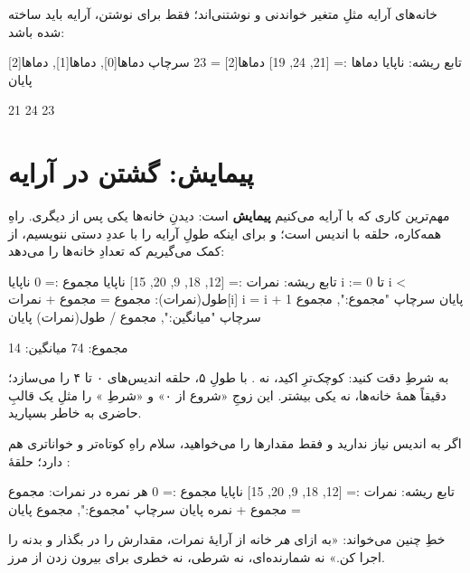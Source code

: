 خانه‌های آرایه مثلِ متغیر خواندنی و نوشتنی‌اند؛ فقط برای نوشتن، آرایه
باید  ساخته شده باشد:

\begin{salamfa}
تابع ریشه:
    ناپایا دماها := [21, 24, 19]
    دماها[2] = 23
    سرچاپ دماها[0], دماها[1], دماها[2]
پایان
\end{salamfa}

\begin{progout}
21 24 23
\end{progout}

\section{پیمایش: گشتن در آرایه}

مهم‌ترین کاری که با آرایه می‌کنیم \textbf{پیمایش} است: دیدنِ خانه‌ها یکی
پس از دیگری. راهِ همه‌کاره، حلقه با اندیس است؛ و برای اینکه طولِ آرایه را
با عددِ دستی ننویسیم، از  کمک می‌گیریم که تعدادِ خانه‌ها را
می‌دهد:

\begin{salamfa}
تابع ریشه:
    نمرات := [12, 18, 9, 20, 15]
    ناپایا مجموع := 0
    ناپایا i := 0
    تا i < طول(نمرات):
        مجموع = مجموع + نمرات[i]
        i = i + 1
    پایان
    سرچاپ "مجموع:", مجموع
    سرچاپ "میانگین:", مجموع / طول(نمرات)
پایان
\end{salamfa}

\begin{progoutfa}
مجموع: 74
میانگین: 14
\end{progoutfa}

به شرطِ  دقت کنید: کوچک‌ترِ اکید، نه \code{<=}. با
طولِ ۵، حلقه اندیس‌های ۰ تا ۴ را می‌سازد؛ دقیقاً همهٔ خانه‌ها، نه یکی
بیشتر. این زوجِ «شروع از ۰» و «شرطِ » را مثلِ یک قالبِ حاضری
به خاطر بسپارید.

اگر به اندیس نیاز ندارید و فقط مقدارها را می‌خواهید، سلام راهِ کوتاه‌تر و
خواناتری هم دارد؛ حلقهٔ :

\begin{salamfa}
تابع ریشه:
    نمرات := [12, 18, 9, 20, 15]
    ناپایا مجموع := 0
    هر نمره در نمرات:
        مجموع = مجموع + نمره
    پایان
    سرچاپ "مجموع:", مجموع
پایان
\end{salamfa}

خطِ  چنین می‌خواند: «به ازای \emph{هر} خانه از
آرایهٔ نمرات، مقدارش را در  بگذار و بدنه را اجرا کن.» نه
شمارنده‌ای، نه شرطی، نه خطری برای بیرون زدن از مرز.

